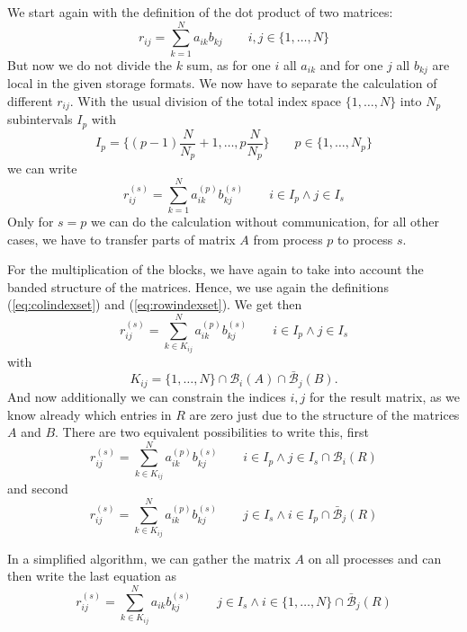 We start again with the definition of the dot product of two matrices:
\begin{displaymath}
  r_{ij}=\sum_{k=1}^N a_{ik}b_{kj}\qquad i,j\in\{1,\ldots,N\}
\end{displaymath}
But now we do not divide the $k$ sum, as for one $i$ all $a_{ik}$ and
for one $j$ all $b_{kj}$ are local in the given storage formats. We
now have to separate the calculation of different $r_{ij}$. With the
usual division of the total index space $\{1,\ldots,N\}$ into $N_p$
subintervals $I_p$ with
\begin{displaymath}
  I_p=\{(p-1)\frac{N}{N_p}+1,\ldots,p\frac{N}{N_p}\}\qquad p\in\{1,\ldots,N_p\}
\end{displaymath}
we can write
\begin{displaymath}
  r_{ij}^{(s)}=\sum_{k=1}^N a_{ik}^{(p)}b_{kj}^{(s)}\qquad
  i\in I_p\wedge j\in I_s
\end{displaymath}
Only for $s=p$ we can do the calculation without communication, for
all other cases, we have to transfer parts of matrix $A$ from process
$p$ to process $s$. 

For the multiplication of the blocks, we have again to take into
account the banded structure of the matrices. Hence, we use again the
definitions (\ref{eq:colindexset}) and (\ref{eq:rowindexset}).
We get then
\begin{displaymath}
  r_{ij}^{(s)}=\sum_{k\in K_{ij}}^N a_{ik}^{(p)}b_{kj}^{(s)}\qquad
  i\in I_p\wedge j\in I_s
\end{displaymath}
with 
\begin{displaymath}
  K_{ij}=\{1,\ldots,N\}\cap\mathcal{B}_i(A)\cap\bar{\mathcal{B}}_j(B).
\end{displaymath}
And now additionally we can constrain the indices $i,j$ for the result
matrix, as we know already which entries in $R$ are zero just due to
the structure of the matrices $A$ and $B$.
There are two equivalent possibilities to write this, first
\begin{displaymath}
  r_{ij}^{(s)}=\sum_{k\in K_{ij}}^N a_{ik}^{(p)}b_{kj}^{(s)}\qquad
  i\in I_p\wedge j\in I_s\cap\mathcal{B}_i(R)
\end{displaymath}
and second
\begin{displaymath}
  r_{ij}^{(s)}=\sum_{k\in K_{ij}}^N a_{ik}^{(p)}b_{kj}^{(s)}\qquad
  j\in I_s\wedge i\in I_p\cap\bar{\mathcal{B}}_j(R)
\end{displaymath}

In a simplified algorithm, we can gather the matrix $A$ on all
processes and can then write the last equation as
\begin{displaymath}
  r_{ij}^{(s)}=\sum_{k\in K_{ij}}^N a_{ik}b_{kj}^{(s)}\qquad
  j\in I_s\wedge i\in\{1,\ldots,N\}\cap\bar{\mathcal{B}}_j(R)
\end{displaymath}



